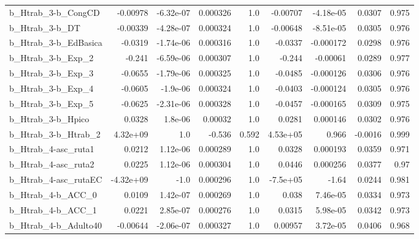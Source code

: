 \begin{tabular}{lrrrrrrrr}
b\_Htrab\_3-b\_CongCD         &    -0.00978 &    -6.32e-07 &  0.000326 &      1.0 &   -0.00707 &   -4.18e-05 &       0.0307 &         0.975 \\
b\_Htrab\_3-b\_DT             &    -0.00339 &    -4.28e-07 &  0.000324 &      1.0 &   -0.00648 &   -8.51e-05 &       0.0305 &         0.976 \\
b\_Htrab\_3-b\_EdBasica       &     -0.0319 &    -1.74e-06 &  0.000316 &      1.0 &    -0.0337 &   -0.000172 &       0.0298 &         0.976 \\
b\_Htrab\_3-b\_Exp\_2          &      -0.241 &    -6.59e-06 &  0.000307 &      1.0 &     -0.244 &    -0.00061 &       0.0289 &         0.977 \\
b\_Htrab\_3-b\_Exp\_3          &     -0.0655 &    -1.79e-06 &  0.000325 &      1.0 &    -0.0485 &   -0.000126 &       0.0306 &         0.976 \\
b\_Htrab\_3-b\_Exp\_4          &     -0.0605 &     -1.9e-06 &  0.000324 &      1.0 &    -0.0403 &   -0.000124 &       0.0305 &         0.976 \\
b\_Htrab\_3-b\_Exp\_5          &     -0.0625 &    -2.31e-06 &  0.000328 &      1.0 &    -0.0457 &   -0.000165 &       0.0309 &         0.975 \\
b\_Htrab\_3-b\_Hpico          &      0.0328 &      1.8e-06 &   0.00032 &      1.0 &     0.0281 &    0.000146 &       0.0302 &         0.976 \\
b\_Htrab\_3-b\_Htrab\_2        &    4.32e+09 &          1.0 &    -0.536 &    0.592 &   4.53e+05 &       0.966 &      -0.0016 &         0.999 \\
b\_Htrab\_4-asc\_ruta1        &      0.0212 &     1.12e-06 &  0.000289 &      1.0 &     0.0328 &    0.000193 &       0.0359 &         0.971 \\
b\_Htrab\_4-asc\_ruta2        &      0.0225 &     1.12e-06 &  0.000304 &      1.0 &     0.0446 &    0.000256 &       0.0377 &          0.97 \\
b\_Htrab\_4-asc\_rutaEC       &   -4.32e+09 &         -1.0 &  0.000296 &      1.0 &   -7.5e+05 &       -1.64 &       0.0244 &         0.981 \\
b\_Htrab\_4-b\_ACC\_0          &      0.0109 &     1.42e-07 &  0.000269 &      1.0 &      0.038 &    7.46e-05 &       0.0334 &         0.973 \\
b\_Htrab\_4-b\_ACC\_1          &      0.0221 &     2.85e-07 &  0.000276 &      1.0 &     0.0315 &    5.98e-05 &       0.0342 &         0.973 \\
b\_Htrab\_4-b\_Adulto40       &    -0.00644 &    -2.06e-07 &  0.000327 &      1.0 &    0.00957 &    3.72e-05 &       0.0406 &         0.968 \\

\end{tabular}
